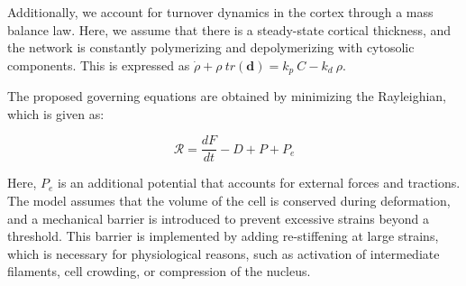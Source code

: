 Additionally, we account for turnover dynamics in the cortex through a
mass balance law. Here, we assume that there is a steady-state cortical
thickness, and the network is constantly polymerizing and depolymerizing
with cytosolic components. This is expressed as
\(\dot{\rho} + \rho \ tr(\mathbf{d}) = k_p\ C - k_d\ \rho\).

The proposed governing equations are obtained by minimizing the
Rayleighian, which is given as:

\[ \mathcal{R} = \frac{dF}{dt} - D + P + P_e \]


%		
%		
%		
%		


Here, \(P_e\) is an additional potential that accounts for external
forces and tractions. The model assumes that the volume of the cell is
conserved during deformation, and a mechanical barrier is introduced to
prevent excessive strains beyond a threshold. This barrier is
implemented by adding re-stiffening at large strains, which is necessary
for physiological reasons, such as activation of intermediate filaments,
cell crowding, or compression of the nucleus.

